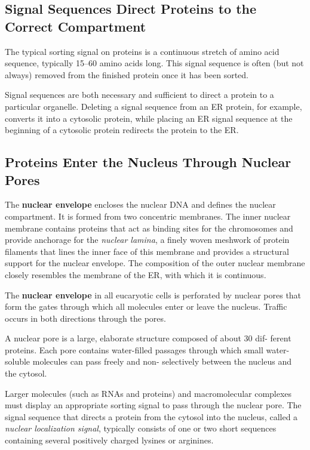 \subsection{Signal Sequences Direct Proteins to the Correct Compartment}

The typical sorting signal on proteins is a continuous stretch of amino
acid sequence, typically 15–60 amino acids long. This signal sequence is
often (but not always) removed from the finished protein once it has been
sorted.

Signal sequences are both necessary and sufficient to direct a protein
to a particular organelle. Deleting 
a signal sequence from an ER protein, for example, converts it into a
cytosolic protein, while placing an ER signal sequence at the beginning
of a cytosolic protein redirects the protein to the ER.

\subsection{Proteins Enter the Nucleus Through Nuclear Pores}

The \textbf{nuclear envelope} encloses the nuclear DNA and defines the nuclear
compartment. It is formed from two concentric membranes. The inner
nuclear membrane contains proteins that act as binding sites for the
chromosomes and provide anchorage for the
\textit{nuclear lamina}, a finely woven meshwork of protein filaments that lines
the inner face of this membrane and provides a structural support for
the nuclear envelope. The composition of the
outer nuclear membrane closely resembles the membrane of the ER, with
which it is continuous.

The \textbf{nuclear envelope} in all eucaryotic cells is perforated by nuclear
pores that form the gates through which all molecules enter or leave the
nucleus. Traffic occurs in both directions through the pores.

A nuclear pore is a large, elaborate structure composed of about 30 dif-
ferent proteins. Each pore contains water-filled passages
through which small water-soluble molecules can pass freely and non-
selectively between the nucleus and the cytosol.

Larger molecules (such as RNAs and proteins) and macromolecular complexes 
must display an appropriate sorting signal to pass through the
nuclear pore. The signal sequence that directs a protein from the cytosol
into the nucleus, called a \textit{nuclear localization signal}, typically consists of
one or two short sequences containing several positively charged lysines
or arginines.

